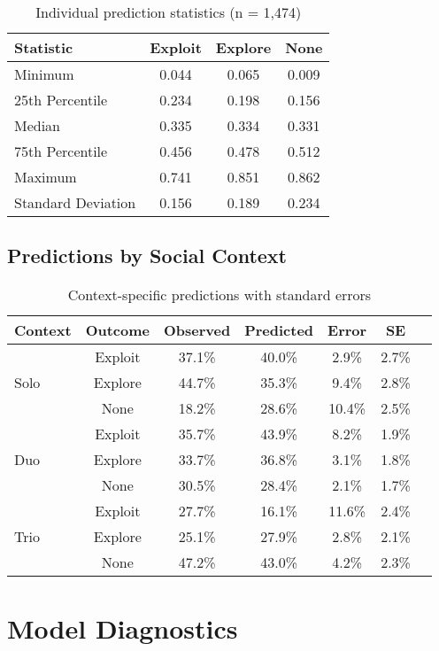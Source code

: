 \documentclass[11pt]{article}
\begin{document}
\begin{table}[h]
\centering
\begin{tabular}{lccc}
\toprule
\textbf{Statistic} & \textbf{Exploit} & \textbf{Explore} & \textbf{None} \\
\midrule
Minimum & 0.044 & 0.065 & 0.009 \\
25th Percentile & 0.234 & 0.198 & 0.156 \\
Median & 0.335 & 0.334 & 0.331 \\
75th Percentile & 0.456 & 0.478 & 0.512 \\
Maximum & 0.741 & 0.851 & 0.862 \\
Standard Deviation & 0.156 & 0.189 & 0.234 \\
\bottomrule
\end{tabular}
\caption{Individual prediction statistics (n = 1,474)}
\end{table}

\subsection{Predictions by Social Context}

\begin{table}[h]
\centering
\begin{tabular}{lcccccc}
\toprule
\textbf{Context} & \textbf{Outcome} & \textbf{Observed} & \textbf{Predicted} & \textbf{Error} & \textbf{SE} \\
\midrule
\multirow{3}{*}{Solo} & Exploit & 37.1\% & 40.0\% & 2.9\% & 2.7\% \\
& Explore & 44.7\% & 35.3\% & 9.4\% & 2.8\% \\
& None & 18.2\% & 28.6\% & 10.4\% & 2.5\% \\
\midrule
\multirow{3}{*}{Duo} & Exploit & 35.7\% & 43.9\% & 8.2\% & 1.9\% \\
& Explore & 33.7\% & 36.8\% & 3.1\% & 1.8\% \\
& None & 30.5\% & 28.4\% & 2.1\% & 1.7\% \\
\midrule
\multirow{3}{*}{Trio} & Exploit & 27.7\% & 16.1\% & 11.6\% & 2.4\% \\
& Explore & 25.1\% & 27.9\% & 2.8\% & 2.1\% \\
& None & 47.2\% & 43.0\% & 4.2\% & 2.3\% \\
\bottomrule
\end{tabular}
\caption{Context-specific predictions with standard errors}
\end{table}

\section{Model Diagnostics}
\end{document}
